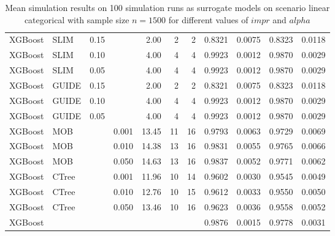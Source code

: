 \begin{table}[!htb]
\begin{tabular}[t]{l|l|r|r|r|r|r|r|r|r|r}
XGBoost & SLIM & 0.15 & & 2.00 & 2 & 2 & 0.8321 & 0.0075 & 0.8323 & 0.0118\\
XGBoost & SLIM & 0.10 & & 4.00 & 4 & 4 & 0.9923 & 0.0012 & 0.9870 & 0.0029\\
XGBoost & SLIM & 0.05 & & 4.00 & 4 & 4 & 0.9923 & 0.0012 & 0.9870 & 0.0029\\
XGBoost & GUIDE & 0.15 & & 2.00 & 2 & 2 & 0.8321 & 0.0075 & 0.8323 & 0.0118\\
XGBoost & GUIDE & 0.10 & & 4.00 & 4 & 4 & 0.9923 & 0.0012 & 0.9870 & 0.0029\\
XGBoost & GUIDE & 0.05 & & 4.00 & 4 & 4 & 0.9923 & 0.0012 & 0.9870 & 0.0029\\
XGBoost & MOB & & 0.001 & 13.45 & 11 & 16 & 0.9793 & 0.0063 & 0.9729 & 0.0069\\
XGBoost & MOB & & 0.010 & 14.38 & 13 & 16 & 0.9831 & 0.0055 & 0.9765 & 0.0066\\
XGBoost & MOB & & 0.050 & 14.63 & 13 & 16 & 0.9837 & 0.0052 & 0.9771 & 0.0062\\
XGBoost & CTree & & 0.001 & 11.96 & 10 & 14 & 0.9602 & 0.0030 & 0.9545 & 0.0049\\
XGBoost & CTree & & 0.010 & 12.76 & 10 & 15 & 0.9612 & 0.0033 & 0.9550 & 0.0050\\
XGBoost & CTree & & 0.050 & 13.46 & 10 & 16 & 0.9623 & 0.0036 & 0.9558 & 0.0052\\
\hline
XGBoost & & & & & & & 0.9876 & 0.0015 & 0.9778 & 0.0031\\
\hline
\end{tabular}
\caption{Mean simulation results on 100 simulation runs as surrogate models  on scenario linear categorical with sample size $n=1500$ for different values of $impr$ and $alpha$}
\label{tab:app_linear_abrupt_1000}

\end{table}



